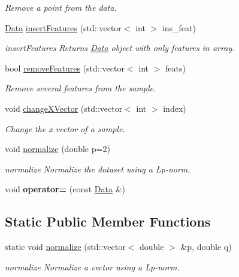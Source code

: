 \begin{DoxyCompactItemize}
\begin{DoxyCompactList}\small\item\em Remove a point from the data. \end{DoxyCompactList}\item 
\hyperlink{class_data}{Data} \hyperlink{class_data_a90e4e972afe7cfd622d4935299def743}{insert\+Features} (std\+::vector$<$ int $>$ ins\+\_\+feat)
\begin{DoxyCompactList}\small\item\em insert\+Features Returns \hyperlink{class_data}{Data} object with only features in array. \end{DoxyCompactList}\item 
bool \hyperlink{class_data_a0e0136f31687452ff10b489f8804ceb8}{remove\+Features} (std\+::vector$<$ int $>$ feats)
\begin{DoxyCompactList}\small\item\em Remove several features from the sample. \end{DoxyCompactList}\item 
void \hyperlink{class_data_a3e66e3dce7675bf2a1eded906e3d7912}{change\+X\+Vector} (std\+::vector$<$ int $>$ index)
\begin{DoxyCompactList}\small\item\em Change the x vector of a sample. \end{DoxyCompactList}\item 
void \hyperlink{class_data_a38bbab57bd9d871bd78771df47529d6b}{normalize} (double p=2)
\begin{DoxyCompactList}\small\item\em normalize Normalize the dataset using a Lp-\/norm. \end{DoxyCompactList}\item 
\mbox{\label{class_data_a02affbc0f8564106c84dc59f34666912}} 
void {\bfseries operator=} (const \hyperlink{class_data}{Data} \&)
\end{DoxyCompactItemize}
\subsection*{Static Public Member Functions}
\begin{DoxyCompactItemize}
\item 
static void \hyperlink{class_data_acd8fd65a56a3d097d1bc19fb8249ee20}{normalize} (std\+::vector$<$ double $>$ \&p, double q)
\begin{DoxyCompactList}\small\item\em normalize Normalize a vector using a Lp-\/norm. \end{DoxyCompactList}\end{DoxyCompactItemize}
